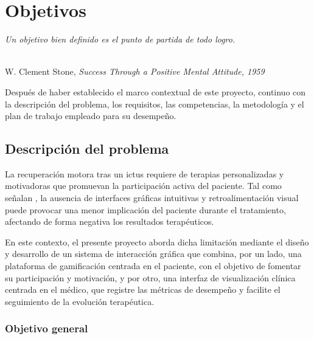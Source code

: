 \chapter{Objetivos}
\label{cap:capitulo2}

\begin{flushright}
\begin{minipage}[]{11cm}
\emph{Un objetivo bien definido es el punto de partida de todo logro.}\\
\end{minipage}\\

W. Clement Stone, \textit{Success Through a Positive Mental Attitude, 1959}\\
\end{flushright}

\vspace{1cm}
\setcounter{footnote}{0}

Después de haber establecido el marco contextual de este proyecto, continuo con la descripción del problema, los requisitos, las competencias, la metodología y el plan de trabajo empleado para su desempeño.\\

\section{Descripción del problema}
\label{sec:descripcion}

La recuperación motora tras un ictus requiere de terapias personalizadas y motivadoras que promuevan la participación activa del paciente.
Tal como señalan \cite{perales4b}, la ausencia de interfaces gráficas intuitivas y retroalimentación visual puede provocar una menor implicación del paciente durante el tratamiento, afectando de forma negativa los resultados terapéuticos.

En este contexto, el presente proyecto aborda dicha limitación mediante el diseño y desarrollo de un sistema de interacción gráfica que combina, por un lado, una plataforma de gamificación centrada en el paciente, con el objetivo de fomentar su participación y motivación, 
y por otro, una interfaz de visualización clínica centrada en el médico, que registre las métricas de desempeño y facilite el seguimiento de la evolución terapéutica.

\subsection{Objetivo general}
\label{sec:descripcion}

